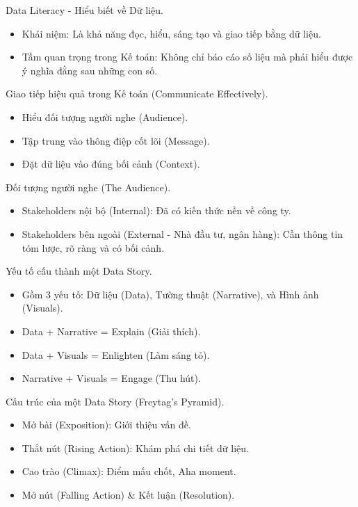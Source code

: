 \documentclass[aspectratio=169]{beamer}
\begin{document}
\begin{frame}{Data Literacy - Hiểu biết về Dữ liệu.}
    \begin{itemize}
        \item Khái niệm: Là khả năng đọc, hiểu, sáng tạo và giao tiếp bằng dữ liệu.
        \item Tầm quan trọng trong Kế toán: Không chỉ báo cáo số liệu mà phải hiểu được ý nghĩa đằng sau những con số.
    \end{itemize}
\end{frame}


\begin{frame}{Giao tiếp hiệu quả trong Kế toán (Communicate Effectively).}
    \begin{itemize}
        \item Hiểu đối tượng người nghe (Audience).
        \item Tập trung vào thông điệp cốt lõi (Message).
        \item Đặt dữ liệu vào đúng bối cảnh (Context).
    \end{itemize}
\end{frame}


\begin{frame}{Đối tượng người nghe (The Audience).}
    \begin{itemize}
        \item Stakeholders nội bộ (Internal): Đã có kiến thức nền về công ty.
        \item Stakeholders bên ngoài (External - Nhà đầu tư, ngân hàng): Cần thông tin tóm lược, rõ ràng và có bối cảnh.
    \end{itemize}
\end{frame}


\begin{frame}{Yếu tố cấu thành một Data Story.}
    \begin{itemize}
        \item Gồm 3 yếu tố: Dữ liệu (Data), Tường thuật (Narrative), và Hình ảnh (Visuals).
        \item Data + Narrative = Explain (Giải thích).
        \item Data + Visuals = Enlighten (Làm sáng tỏ).
        \item Narrative + Visuals = Engage (Thu hút).
    \end{itemize}
\end{frame}


\begin{frame}{Cấu trúc của một Data Story (Freytag's Pyramid).}
    \begin{itemize}
        \item Mở bài (Exposition): Giới thiệu vấn đề.
        \item Thắt nút (Rising Action): Khám phá chi tiết dữ liệu.
        \item Cao trào (Climax): Điểm mấu chốt, Aha moment.
        \item Mở nút (Falling Action) \& Kết luận (Resolution).
    \end{itemize}
\end{frame}
\end{document}
